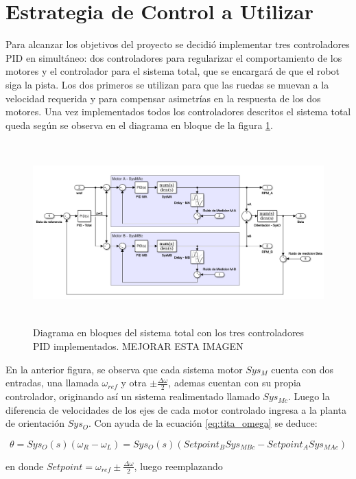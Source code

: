 \documentclass[10pt,conference,a4paper,onecolumn]{article}%
\begin{document}
\section{Estrategia de Control a Utilizar}
\label{sec:estrategia_de_control}
Para alcanzar los objetivos del proyecto se decidió implementar tres controladores PID en simultáneo: dos controladores para regularizar el comportamiento de los motores y el controlador para el sistema total, que se encargará de que el robot siga la pista. Los dos primeros se utilizan para que las ruedas se muevan a la velocidad requerida y para compensar asimetrías en la respuesta de los dos motores.
Una vez implementados todos los controladores descritos el sistema total queda según se observa en el diagrama en bloque de la figura \ref{diagra en bloques sist total}.
\begin{figure}[h]
\centering
\includegraphics[height=7cm]{./imagenes/sistema_total}
\caption{Diagrama en bloques del sistema total con los tres controladores PID implementados. MEJORAR ESTA IMAGEN}
\label{diagra en bloques sist total}
\end{figure}

En la anterior figura, se observa que cada sistema motor $Sys_M$ cuenta con dos entradas, una llamada $\omega_{ref}$ y otra $\pm \frac{\Delta \omega}{2}$, ademas cuentan con su propia controlador, originando así un sistema realimentado llamado $Sys_{Mc}$. Luego la diferencia de velocidades de los  ejes de cada motor controlado ingresa a la planta de orientación $Sys_O$. Con ayuda de la ecuación \ref{eq:tita_omega}  se deduce:

\begin{equation}
\theta=Sys_O(s)(\omega_R - \omega_L)=Sys_O(s)\left( Setpoint_BSys_{MBc} - Setpoint_ASys_{MAc}   \right)
\end{equation}

en donde $Setpoint = \omega_{ref} \pm \frac{\Delta \omega}{2}$, luego reemplazando
\end{document}
